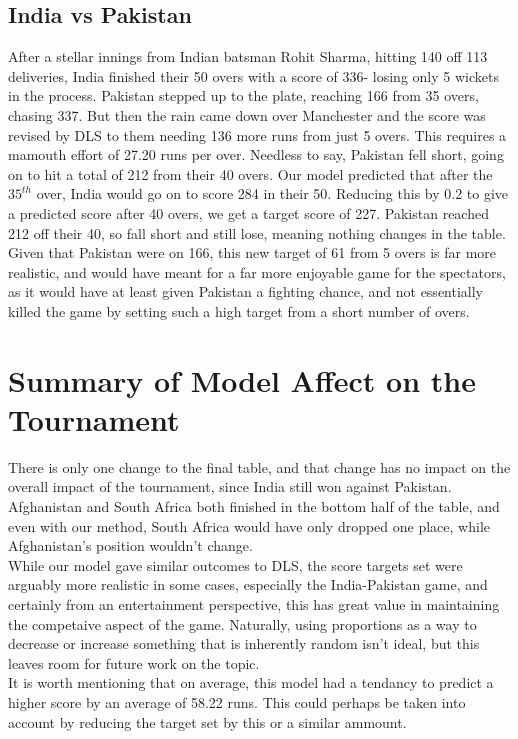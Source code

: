 \subsection{India vs Pakistan}
After a stellar innings from Indian batsman Rohit Sharma, hitting 140 off 113 deliveries, India finished their 50 overs with a score of 336- losing only 5 wickets in the process. Pakistan stepped up to the plate, reaching 
166 from 35 overs, chasing 337. But then the rain came down over Manchester and the score was revised by DLS to them needing 136 more runs from just 5 overs. This requires a mamouth effort of 27.20 runs per over. Needless to say,
Pakistan fell short, going on to hit a total of 212 from their 40 overs. Our model predicted that after the $35^{th}$ over, India would go on to score 284 in their 50. Reducing this by 0.2 to give a predicted score after 40 overs, 
we get a target score of 227. Pakistan reached 212 off their 40, so fall short and still lose, meaning nothing changes in the table. Given that Pakistan were on 166, this new target of 61 from 5 overs is far more realistic, and would have 
meant for a far more enjoyable game for the spectators, as it would have at least given Pakistan a fighting chance, and not essentially killed the game by setting such a high target from a short number 
of overs. 

\section{Summary of Model Affect on the Tournament}
There is only one change to the final table, and that change has no impact on the overall impact of the tournament, since India still won against Pakistan. Afghanistan and South Africa both finished in the bottom 
half of the table, and even with our method, South Africa would have only dropped one place, while Afghanistan's position wouldn't change. \\

While our model gave similar outcomes to DLS, the score targets set were arguably more realistic in some cases, especially the India-Pakistan game, and certainly from an entertainment perspective, this 
has great value in maintaining the competaive aspect of the game. Naturally, using proportions as a way to decrease or increase something that is inherently random isn't ideal, but this leaves room for future work 
on the topic.  \\

It is worth mentioning that on average, this model had a tendancy to predict a higher score by an average of 58.22 runs. This could perhaps be taken into account by reducing the target set by this or a similar 
ammount. 